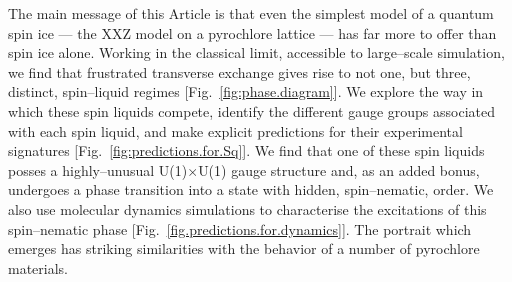 \documentclass[apsrev4-1,prx,superscriptaddress,floatfix,twocolumn,longbibliography]{revtex4-1}
\begin{document}

The main message of this Article is that even the simplest model of a 
 quantum spin ice --- the XXZ model on a pyrochlore lattice --- 
has far more to offer than spin ice alone.
%
Working in the classical limit, accessible to large--scale simulation, 
we find that frustrated transverse exchange gives rise to not one, 
but three, distinct, spin--liquid regimes [Fig.~\ref{fig:phase.diagram}]. 
%
We explore the way in which these spin liquids compete, 
identify the different gauge groups associated with each 
spin liquid, and make explicit predictions for their experimental 
signatures [Fig.~\ref{fig:predictions.for.Sq}].
%
We find that one of these spin liquids posses a highly--unusual
U(1)$\times$U(1) gauge structure and, as an added bonus, 
undergoes a %
phase transition into a state with hidden, spin--nematic, order.
%
We also use molecular dynamics simulations to characterise the 
excitations of this spin--nematic phase [Fig.~\ref{fig.predictions.for.dynamics}].
%
The portrait which emerges has striking similarities with the 
behavior of a number of pyrochlore materials.

\end{document}
